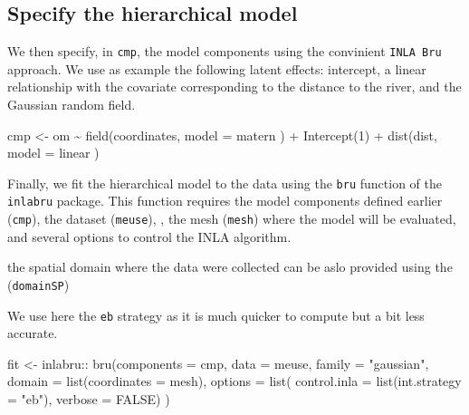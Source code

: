 \documentclass[
  a4paper,
]{article}
\newenvironment{Shaded}{\begin{snugshade}}{\end{snugshade}}
\newcommand{\AttributeTok}[1]{\textcolor[rgb]{0.40,0.45,0.13}{#1}}
\newcommand{\ConstantTok}[1]{\textcolor[rgb]{0.56,0.35,0.01}{#1}}
\newcommand{\DecValTok}[1]{\textcolor[rgb]{0.68,0.00,0.00}{#1}}
\newcommand{\FunctionTok}[1]{\textcolor[rgb]{0.28,0.35,0.67}{#1}}
\newcommand{\NormalTok}[1]{\textcolor[rgb]{0.00,0.23,0.31}{#1}}
\newcommand{\OtherTok}[1]{\textcolor[rgb]{0.00,0.23,0.31}{#1}}
\newcommand{\SpecialCharTok}[1]{\textcolor[rgb]{0.37,0.37,0.37}{#1}}
\newcommand{\StringTok}[1]{\textcolor[rgb]{0.13,0.47,0.30}{#1}}
\begin{document}
\hypertarget{specify-the-hierarchical-model}{%
\subsection{Specify the hierarchical
model}\label{specify-the-hierarchical-model}}

We then specify, in \texttt{cmp}, the model components using the
convinient \texttt{INLA\ Bru} approach. We use as example the following
latent effects: intercept, a linear relationship with the covariate
corresponding to the distance to the river, and the Gaussian random
field.

\begin{Shaded}
\begin{Highlighting}[]
\NormalTok{cmp }\OtherTok{\textless{}{-}}\NormalTok{ om }\SpecialCharTok{\textasciitilde{}} 
  \FunctionTok{field}\NormalTok{(coordinates, }\AttributeTok{model =}\NormalTok{ matern ) }\SpecialCharTok{+} 
  \FunctionTok{Intercept}\NormalTok{(}\DecValTok{1}\NormalTok{) }\SpecialCharTok{+} 
  \FunctionTok{dist}\NormalTok{(dist, }\AttributeTok{model =} \StringTok{\textquotesingle{}linear\textquotesingle{}}\NormalTok{ )     }
\end{Highlighting}
\end{Shaded}

Finally, we fit the hierarchical model to the data using the
\texttt{bru} function of the \texttt{inlabru} package. This function
requires the model components defined earlier (\texttt{cmp}), the
dataset (\texttt{meuse}), , the mesh (\texttt{mesh}) where the model
will be evaluated, and several options to control the INLA algorithm.

the spatial domain where the data were collected can be aslo provided
using the (\texttt{domainSP})

We use here the \texttt{eb} strategy as it is much quicker to compute
but a bit less accurate.

\begin{Shaded}
\begin{Highlighting}[]
\NormalTok{fit }\OtherTok{\textless{}{-}}\NormalTok{ inlabru}\SpecialCharTok{::} \FunctionTok{bru}\NormalTok{(}\AttributeTok{components =}\NormalTok{ cmp,}
           \AttributeTok{data =}\NormalTok{ meuse,}
           \AttributeTok{family =} \StringTok{"gaussian"}\NormalTok{,}
           \AttributeTok{domain =} \FunctionTok{list}\NormalTok{(}\AttributeTok{coordinates =}\NormalTok{ mesh),}
           \AttributeTok{options =} \FunctionTok{list}\NormalTok{(}
             \AttributeTok{control.inla =} \FunctionTok{list}\NormalTok{(}\AttributeTok{int.strategy =} \StringTok{"eb"}\NormalTok{),}
             \AttributeTok{verbose =} \ConstantTok{FALSE}\NormalTok{)}
\NormalTok{           )}
\end{Highlighting}
\end{Shaded}
\end{document}
